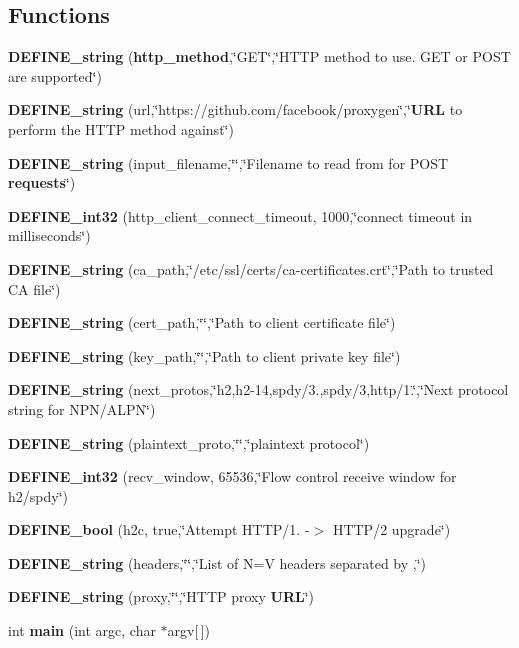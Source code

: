 \subsection*{Functions}
\begin{DoxyCompactItemize}
\item 
{\bf D\+E\+F\+I\+N\+E\+\_\+string} ({\bf http\+\_\+method},\char`\"{}G\+ET\char`\"{},\char`\"{}H\+T\+TP method to use. G\+ET or P\+O\+ST are supported\char`\"{})
\item 
{\bf D\+E\+F\+I\+N\+E\+\_\+string} (url,\char`\"{}https\+://github.\+com/facebook/proxygen\char`\"{},\char`\"{}{\bf U\+RL} to perform the H\+T\+TP method against\char`\"{})
\item 
{\bf D\+E\+F\+I\+N\+E\+\_\+string} (input\+\_\+filename,\char`\"{}\char`\"{},\char`\"{}Filename to read from for P\+O\+ST {\bf requests}\char`\"{})
\item 
{\bf D\+E\+F\+I\+N\+E\+\_\+int32} (http\+\_\+client\+\_\+connect\+\_\+timeout, 1000,\char`\"{}connect timeout in milliseconds\char`\"{})
\item 
{\bf D\+E\+F\+I\+N\+E\+\_\+string} (ca\+\_\+path,\char`\"{}/etc/ssl/certs/ca-\/certificates.\+crt\char`\"{},\char`\"{}Path to trusted CA file\char`\"{})
\item 
{\bf D\+E\+F\+I\+N\+E\+\_\+string} (cert\+\_\+path,\char`\"{}\char`\"{},\char`\"{}Path to client certificate file\char`\"{})
\item 
{\bf D\+E\+F\+I\+N\+E\+\_\+string} (key\+\_\+path,\char`\"{}\char`\"{},\char`\"{}Path to client private key file\char`\"{})
\item 
{\bf D\+E\+F\+I\+N\+E\+\_\+string} (next\+\_\+protos,\char`\"{}h2,h2-\/14,spdy/3.,spdy/3,http/1.\char`\"{},\char`\"{}Next protocol string for N\+PN/A\+L\+PN\char`\"{})
\item 
{\bf D\+E\+F\+I\+N\+E\+\_\+string} (plaintext\+\_\+proto,\char`\"{}\char`\"{},\char`\"{}plaintext protocol\char`\"{})
\item 
{\bf D\+E\+F\+I\+N\+E\+\_\+int32} (recv\+\_\+window, 65536,\char`\"{}Flow control receive window for h2/spdy\char`\"{})
\item 
{\bf D\+E\+F\+I\+N\+E\+\_\+bool} (h2c, true,\char`\"{}Attempt H\+T\+TP/1. -\/$>$ H\+T\+TP/2 upgrade\char`\"{})
\item 
{\bf D\+E\+F\+I\+N\+E\+\_\+string} (headers,\char`\"{}\char`\"{},\char`\"{}List of N=V headers separated by ,\char`\"{})
\item 
{\bf D\+E\+F\+I\+N\+E\+\_\+string} (proxy,\char`\"{}\char`\"{},\char`\"{}H\+T\+TP proxy {\bf U\+RL}\char`\"{})
\item 
int {\bf main} (int argc, char $\ast$argv[$\,$])
\end{DoxyCompactItemize}


